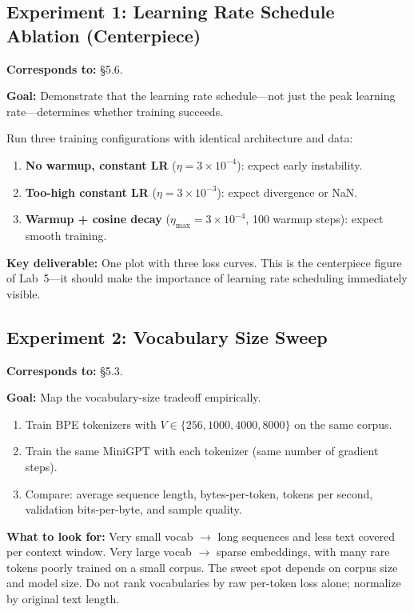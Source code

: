 \subsection*{Experiment 1: Learning Rate Schedule Ablation (Centerpiece)}

\textbf{Corresponds to:} \S5.6.

\textbf{Goal:} Demonstrate that the learning rate schedule---not just the peak learning rate---determines whether training succeeds.

Run three training configurations with identical architecture and data:

\begin{enumerate}[nosep]
    \item \textbf{No warmup, constant LR} ($\eta = 3 \times 10^{-4}$): expect early instability.
    \item \textbf{Too-high constant LR} ($\eta = 3 \times 10^{-3}$): expect divergence or NaN.
    \item \textbf{Warmup + cosine decay} ($\eta_{\max} = 3 \times 10^{-4}$, 100 warmup steps): expect smooth training.
\end{enumerate}

\textbf{Key deliverable:} One plot with three loss curves. This is the centerpiece figure of Lab~5---it should make the importance of learning rate scheduling immediately visible.

\subsection*{Experiment 2: Vocabulary Size Sweep}

\textbf{Corresponds to:} \S5.3.

\textbf{Goal:} Map the vocabulary-size tradeoff empirically.

\begin{enumerate}[nosep]
    \item Train BPE tokenizers with $V \in \{256, 1000, 4000, 8000\}$ on the same corpus.
    \item Train the same MiniGPT with each tokenizer (same number of gradient steps).
    \item Compare: average sequence length, bytes-per-token, tokens per second, validation bits-per-byte, and sample quality.
\end{enumerate}

\textbf{What to look for:} Very small vocab $\to$ long sequences and less text covered per context window. Very large vocab $\to$ sparse embeddings, with many rare tokens poorly trained on a small corpus. The sweet spot depends on corpus size and model size. Do not rank vocabularies by raw per-token loss alone; normalize by original text length.

